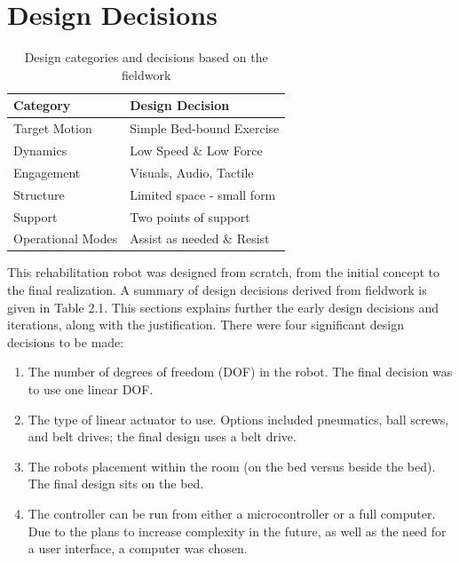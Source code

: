 \documentclass[12pt]{report}
\begin{document}
\section{Design Decisions} 


	\begin{table}[h]
	\centering
	\caption{Design categories and decisions based on the fieldwork}	
	\begin{tabular}{|l|l|}
		\hline
		\cellcolor{gray!10} Category & \cellcolor{gray!10} Design Decision  \\
		\hline
		Target Motion & Simple Bed-bound Exercise \\
		\hline
		Dynamics & Low Speed \& Low Force \\
		\hline
		Engagement & Visuals, Audio, Tactile \\
		\hline
		Structure & Limited space - small form \\
		\hline
		Support & Two points of support \\
		\hline
		Operational Modes & Assist as needed \& Resist \\
		\hline
		\end{tabular}
	\label{tab:fieldwork}
	\end{table}
	

	This rehabilitation robot was designed from scratch, from the initial concept to the final realization. A summary of design decisions derived from fieldwork is given in Table 2.1. This sections explains further the early design decisions and iterations, along with the justification. There were four significant design decisions to be made:
	
	\begin{enumerate}
		\item The number of degrees of freedom (DOF) in the robot. The final decision was to use one linear DOF.
		\item The type of linear actuator to use. Options included pneumatics, ball screws, and belt drives; the final design uses a belt drive.
		\item The robots placement within the room (on the bed versus beside the bed). The final design sits on the bed.
		\item The controller can be run from either a microcontroller or a full computer. Due to the plans to increase complexity in the future, as well as the need for a user interface, a computer was chosen. 
	\end{enumerate}
	
\end{document}

